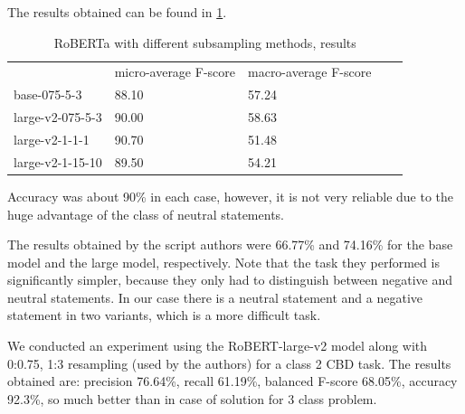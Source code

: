 \documentclass[a4paper]{article}
\begin{document}
The results obtained can be found in \ref{tab:roberta_results}. 

\begin{table}[h]
\centering
\begin{tabular}{|l|l|l|ll}
\cline{1-3}
                 & micro-average F-score & macro-average F-score &  &  \\ \cline{1-3}
base-075-5-3     & 88.10                 & 57.24                 &  &  \\ \cline{1-3}
large-v2-075-5-3 & 90.00                 & 58.63                 &  &  \\ \cline{1-3}
large-v2-1-1-1   & 90.70                 & 51.48                 &  &  \\ \cline{1-3}
large-v2-1-15-10 & 89.50                 & 54.21                 &  &  \\ \cline{1-3}
\end{tabular}
\caption{RoBERTa with different subsampling methods, results}
\label{tab:roberta_results}
\end{table}

Accuracy was about 90\% in each case, however, it is not very reliable due to the huge advantage of the class of neutral statements.

The results obtained by the script authors were 66.77\% and 74.16\% for the base model and the large model, respectively. Note that the task they performed is significantly simpler, because they only had to distinguish between negative and neutral statements. In our case there is a neutral statement and a negative statement in two variants, which is a more difficult task.

We conducted an experiment using the RoBERT-large-v2 model along with 0:0.75, 1:3 resampling (used by the authors) for a class 2 CBD task. The results obtained are: precision 76.64\%, recall 61.19\%, balanced F-score 68.05\%, accuracy 92.3\%, so much better than in case of solution for 3 class problem.

\newpage
\end{document}
